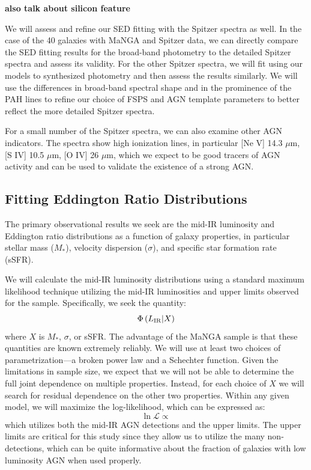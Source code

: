 \documentclass[12pt, preprint]{hacked-aastex}
\begin{document}
{\bf also talk about silicon feature}

We will assess and refine our SED fitting with the Spitzer spectra as
well.  In the case of the 40 galaxies with MaNGA and Spitzer data, we
can directly compare the SED fitting results for the broad-band
photometry to the detailed Spitzer spectra and assess its
validity. For the other Spitzer spectra, we will fit using our models
to synthesized photometry and then assess the results similarly. We
will use the differences in broad-band spectral shape and in the
prominence of the PAH lines to refine our choice of FSPS and AGN
template parameters to better reflect the more detailed Spitzer
spectra.

For a small number of the Spitzer spectra, we can also examine other
AGN indicators. The spectra show high ionization lines, in particular
[Ne V] 14.3 $\mu$m, [S IV] 10.5 $\mu$m, [O IV] 26 $\mu$m, which we
expect to be good tracers of AGN activity and can be used to validate
the existence of a strong AGN.

\subsection{Fitting Eddington Ratio Distributions}
\label{sec:erd}

The primary observational results we seek are the mid-IR luminosity
and Eddington ratio distributions as a function of galaxy properties,
in particular stellar mass ($M_\ast$), velocity dispersion ($\sigma$),
and specific star formation rate (sSFR).

We will calculate the mid-IR luminosity distributions using a standard
maximum likelihood technique utilizing the mid-IR luminosities and
upper limits observed for the sample. Specifically, we seek the
quantity:
\begin{equation}
\Phi\left(L_{\rm IR} | X\right)
\end{equation}
where $X$ is $M_\ast$, $\sigma$, or sSFR. The advantage of the MaNGA
sample is that these quantities are known extremely reliably. We will
use at least two choices of parametrization---a broken power law and a
Schechter function. Given the limitations in sample size, we expect
that we will not be able to determine the full joint dependence on
multiple properties. Instead, for each choice of $X$ we will search
for residual dependence on the other two properties. Within any given
model, we will maximize the log-likelihood, which can be expressed as:
\begin{equation}
\ln \mathcal{L} \propto 
\end{equation}
which utilizes both the mid-IR AGN detections and the upper
limits. The upper limits are critical for this study since they allow
us to utilize the many non-detections, which can be quite informative
about the fraction of galaxies with low luminosity AGN when used
properly.
\end{document}
